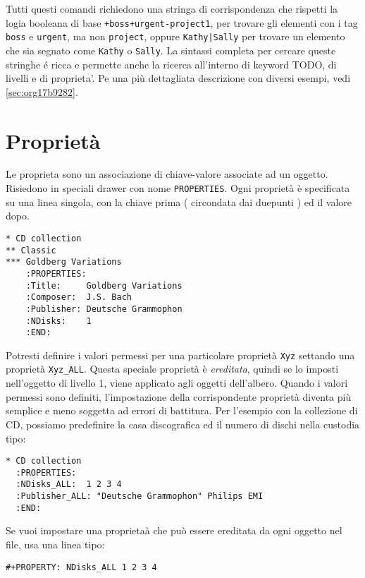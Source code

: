 \documentclass[11pt]{article}
\begin{document}
Tutti questi comandi richiedono una stringa di corrispondenza che
rispetti la logia booleana di base \texttt{+boss+urgent-project1}, per
trovare gli elementi con i tag \texttt{boss} e \texttt{urgent}, ma non \texttt{project},
oppure \texttt{Kathy|Sally} per trovare un elemento che sia segnato come
\texttt{Kathy} o \texttt{Sally}. La sintassi completa per cercare queste stringhe é
ricca e permette anche la ricerca all'interno di keyword TODO, di
livelli e di proprieta'. Pe una più dettagliata descrizione con
diversi esempi, vedi \ref{sec:org17b9282}.

\section{Proprietà}
\label{sec:org306bfd2}
Le proprieta sono un associazione di chiave-valore associate ad un
oggetto. Risiedono in speciali drawer con nome \texttt{PROPERTIES}. Ogni
proprietà è specificata su una linea singola, con la chiave prima (
circondata dai duepunti ) ed il valore dopo.

\begin{verbatim}
* CD collection
** Classic
*** Goldberg Variations
    :PROPERTIES:
    :Title:     Goldberg Variations
    :Composer:  J.S. Bach
    :Publisher: Deutsche Grammophon
    :NDisks:    1
    :END:
\end{verbatim}

Potresti definire i valori permessi per una particolare proprietà
\texttt{Xyz} settando una proprietà \texttt{Xyz\_ALL}. Questa speciale proprietà è
\emph{ereditata}, quindi se lo imposti nell'oggetto di livello 1, viene
applicato agli oggetti dell'albero. Quando i valori permessi sono
definiti, l'impostazione della corrispondente proprietà diventa più
semplice e meno soggetta ad errori di battitura. Per l'esempio con la
collezione di CD, possiamo predefinire la casa discografica ed il
numero di dischi nella custodia tipo:

\begin{verbatim}
* CD collection
  :PROPERTIES:
  :NDisks_ALL:  1 2 3 4
  :Publisher_ALL: "Deutsche Grammophon" Philips EMI
  :END:
\end{verbatim}

Se vuoi impostare una proprietaà che può essere ereditata da ogni
oggetto nel file, usa una linea tipo:

\begin{verbatim}
#+PROPERTY: NDisks_ALL 1 2 3 4
\end{verbatim}
\end{document}
